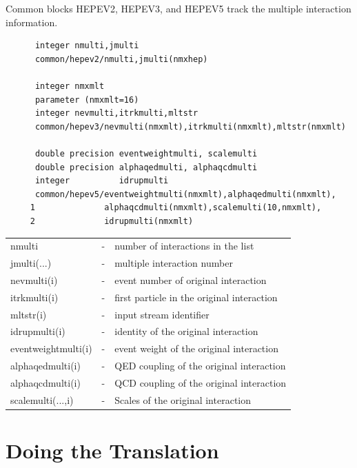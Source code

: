 \noindent Common blocks HEPEV2, HEPEV3, and HEPEV5 track the
multiple interaction information.
\begin{verbatim}
      integer nmulti,jmulti
      common/hepev2/nmulti,jmulti(nmxhep)

      integer nmxmlt
      parameter (nmxmlt=16)
      integer nevmulti,itrkmulti,mltstr
      common/hepev3/nevmulti(nmxmlt),itrkmulti(nmxmlt),mltstr(nmxmlt)

      double precision eventweightmulti, scalemulti
      double precision alphaqedmulti, alphaqcdmulti
      integer          idrupmulti
      common/hepev5/eventweightmulti(nmxmlt),alphaqedmulti(nmxmlt),
     1              alphaqcdmulti(nmxmlt),scalemulti(10,nmxmlt),
     2              idrupmulti(nmxmlt)
\end{verbatim}
\begin{center}
\begin{tabular}{lcl}
  nmulti              &-& number of interactions in the list\\
  jmulti(...)         &-& multiple interaction number\\
  nevmulti(i)         &-& event number of original interaction\\
  itrkmulti(i)        &-& first particle in the original interaction\\
  mltstr(i)           &-& input stream identifier\\
  idrupmulti(i)       &-& identity of the original interaction\\
  eventweightmulti(i) &-& event weight of the original interaction\\
  alphaqedmulti(i)    &-& QED coupling of the original interaction\\
  alphaqcdmulti(i)    &-& QCD coupling of the original interaction\\
  scalemulti(...,i)   &-& Scales of the original interaction\\
\end{tabular}
\end{center}


\section { Doing the Translation }


